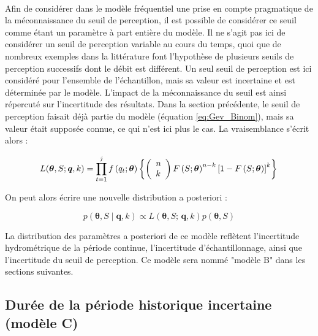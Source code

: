 \documentclass[11pt]{article}
\begin{document}
		\paragraph{}
		Afin de considérer dans le modèle fréquentiel une prise en compte pragmatique de la méconnaissance du seuil de perception, il est possible de considérer ce seuil comme étant un paramètre à part entière du modèle. Il ne s'agit pas ici de considérer un seuil de perception variable au cours du temps, quoi que de nombreux exemples dans la littérature font l'hypothèse de plusieurs seuils de perception successifs dont le débit est différent. Un seul seuil de perception est ici considéré pour l'ensemble de l'échantillon, mais sa valeur est incertaine et est déterminée par le modèle. L'impact de la méconnaissance du seuil est ainsi répercuté sur l'incertitude des résultats. Dans la section précédente, le seuil de perception faisait déjà partie du modèle (équation \ref{eq:Gev_Binom}), mais sa valeur était supposée connue, ce qui n'est ici plus le cas. La vraisemblance s'écrit alors : 
		
				\begin{equation}
				L(\boldsymbol{\theta}, S ; \boldsymbol{q}, k) =\prod_{t=1}^j f\left(q_t;\boldsymbol{\theta}\right) \left\{\left(\begin{array}{l}
				n \\
				k
				\end{array}\right) F\left(S;\boldsymbol{\theta}\right)^{n-k}\left[1-F\left(S;\boldsymbol{\theta}\right)\right]^k\right\} \\
				\label{eq:Gev_Binom_uS}
				\end{equation}
				
		On peut alors écrire une nouvelle distribution a posteriori : 			
				
				\begin{equation}
					p(\boldsymbol{\theta}, S \mid \boldsymbol{q},k) \propto L(\boldsymbol{\theta},S;\,\boldsymbol{q},k) p(\boldsymbol{\theta},S)
					\label{eq:Bayes_uS}
				\end{equation}
			
		La distribution des paramètres a posteriori de ce modèle reflètent l'incertitude hydrométrique de la période continue, l'incertitude d'échantillonnage, ainsi que l'incertitude du seuil de perception. Ce modèle sera nommé "modèle B" dans les sections suivantes.
		

	\subsection{Durée de la période historique incertaine (modèle C)}
	\label{subsec:modC}
	
\end{document}

